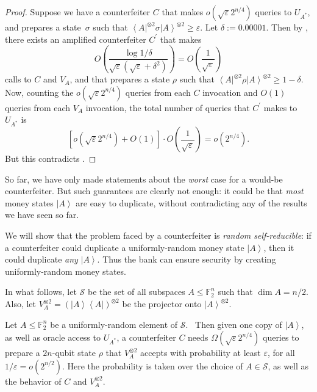 \begin{proof}
Suppose we have a counterfeiter $C$ that makes $o\left(  \sqrt{\varepsilon
}2^{n/4}\right)  $ queries to $U_{A^{\ast}}$, and prepares a state\ $\sigma
$ such that $\left\langle A\right\vert ^{\otimes2}\sigma\left\vert
A\right\rangle ^{\otimes2}\geq\varepsilon$. Let $\delta:=0.00001$. Then by
, there exists an amplified counterfeiter $C^{\prime}%
$ that makes%
\[
O\left(  \frac{\log1/\delta}{\sqrt{\varepsilon}\left(  \sqrt{\varepsilon
}+\delta^{2}\right)  }\right)  =O\left(  \frac{1}{\sqrt{\varepsilon}}\right)
\]
calls to $C$ and $V_{A}$, and that prepares a state $\rho$ such that
$\left\langle A\right\vert ^{\otimes2}\rho\left\vert A\right\rangle
^{\otimes2}\geq1-\delta$. Now, counting the $o\left(  \sqrt{\varepsilon
}2^{n/4}\right)  $ queries from each $C$ invocation and $O\left(  1\right)
$ queries from each $V_{A}$ invocation, the total number of queries that
$C^{\prime}$ makes to $U_{A^{\ast}}$ is%
\[
\left[  o\left(  \sqrt{\varepsilon}2^{n/4}\right)  +O\left(  1\right)
\right]  \cdot O\left(  \frac{1}{\sqrt{\varepsilon}}\right)  =o\left(
2^{n/4}\right)  .
\]
But this contradicts .
\end{proof}

So far, we have only made statements about the \emph{worst} case for a
would-be counterfeiter. But such guarantees are clearly not enough: it could
be that \emph{most} money states $\left\vert A\right\rangle $ are easy to
duplicate, without contradicting any of the results we have seen so far.

We will show that the problem faced by a counterfeiter is \emph{random
self-reducible}: if a counterfeiter could duplicate a uniformly-random money
state $\left\vert A\right\rangle $, then it could duplicate \emph{any}
$\left\vert A\right\rangle $. Thus the bank can ensure security by creating
uniformly-random money states.

In what follows, let $\mathcal{S}$ be the set of all subspaces $A\leq
\mathbb{F}_{2}^{n}$ such that $\dim A=n/2$. Also, let $V_{A}^{\otimes
2}=\left(  \left\vert A\right\rangle \left\langle A\right\vert \right)
^{\otimes2}$ be the projector onto $\left\vert A\right\rangle ^{\otimes2}$.

\begin{theorem}
\label{averagecase}Let
$A\leq\mathbb{F}_{2}^{n}$ be a uniformly-random element of $\mathcal{S}$.
\ Then given one copy of $\left\vert A\right\rangle $, as well as oracle
access to $U_{A^{\ast}}$, a counterfeiter $C$ needs $\Omega\left(
\sqrt{\varepsilon}2^{n/4}\right)  $ queries to prepare a $2n$-qubit state
$\rho$ that $V_{A}^{\otimes2}$ accepts with probability at least
$\varepsilon$, for all $1/\varepsilon=o\left(  2^{n/2}\right)  $. Here the
probability is taken over the choice of $A\in\mathcal{S}$, as well as the
behavior of $C$ and $V_{A}^{\otimes2}$.
\end{theorem}


